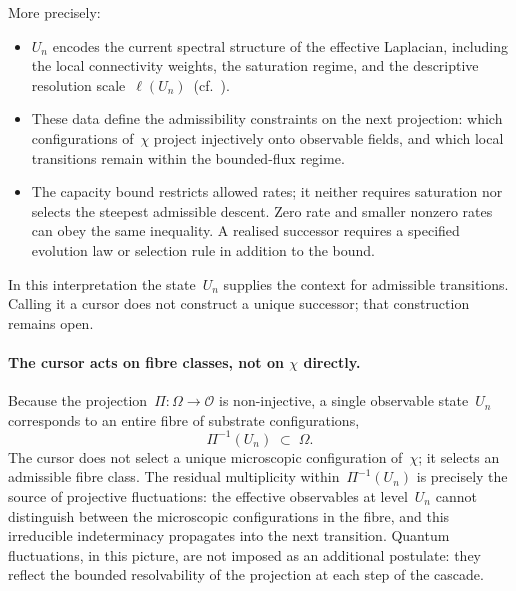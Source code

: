     More precisely:
    \begin{itemize}
      \item $U_n$ encodes the current spectral structure of the effective Laplacian,
      including the local connectivity weights, the saturation regime, and the
      descriptive resolution scale~$\ell(U_n)$~(cf.~\cite{Beau2026d}).
      \item These data define the admissibility constraints on the next projection:
      which configurations of~$\chi$ project injectively onto observable fields,
      and which local transitions remain within the bounded-flux regime.
      \item The capacity bound restricts allowed rates; it neither requires saturation nor
      selects the steepest admissible descent.
      Zero rate and smaller nonzero rates can obey the same inequality.
      A realised successor requires a specified evolution law or selection rule in addition to the bound.
    \end{itemize}
    In this interpretation the state~$U_n$ supplies the context for admissible transitions.
    Calling it a cursor does not construct a unique successor; that construction remains open.

  \paragraph{The cursor acts on fibre classes, not on $\chi$ directly.}
    Because the projection~$\Pi : \Omega \to \mathcal{O}$ is non-injective, a single
    observable state~$U_n$ corresponds to an entire fibre of substrate
    configurations,
    \begin{equation}
      \Pi^{-1}(U_n) \;\subset\; \Omega.
    \end{equation}
    The cursor does not select a unique microscopic configuration of~$\chi$; it selects
    an admissible fibre class.
    The residual multiplicity within~$\Pi^{-1}(U_n)$ is precisely the source of
    projective fluctuations: the effective observables at level~$U_n$ cannot
    distinguish between the microscopic configurations in the fibre, and this
    irreducible indeterminacy propagates into the next transition.
    Quantum fluctuations, in this picture, are not imposed as an additional
    postulate: they reflect the bounded resolvability of the projection at each step
    of the cascade.

